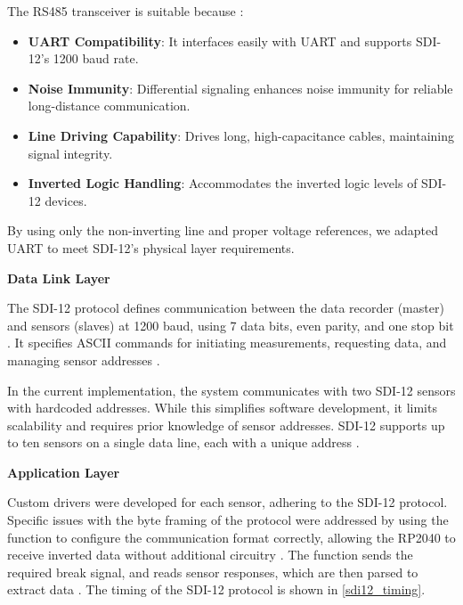 The RS485 transceiver is suitable because \cite{AnalogDevicesMAX1487}:

\begin{itemize} 
    \item \textbf{UART Compatibility}: It interfaces easily with UART and supports SDI-12's 1200 baud rate. 
    \item \textbf{Noise Immunity}: Differential signaling enhances noise immunity for reliable long-distance communication. 
    \item \textbf{Line Driving Capability}: Drives long, high-capacitance cables, maintaining signal integrity. 
    \item \textbf{Inverted Logic Handling}: Accommodates the inverted logic levels of SDI-12 devices. 
\end{itemize}

By using only the non-inverting line and proper voltage references, we adapted UART to meet SDI-12's physical layer requirements.

\textbf{Data Link Layer}

The SDI-12 protocol defines communication between the data recorder (master) and sensors (slaves) at 1200 baud, using 7 data bits, even parity, and one stop bit \cite{sdi12_datasheet}. It specifies ASCII commands for initiating measurements, requesting data, and managing sensor addresses \cite{sdi12_datasheet}.

In the current implementation, the system communicates with two SDI-12 sensors with hardcoded addresses. While this simplifies software development, it limits scalability and requires prior knowledge of sensor addresses. SDI-12 supports up to ten sensors on a single data line, each with a unique address \cite{sdi12_datasheet}.

\textbf{Application Layer}

Custom drivers were developed for each sensor, adhering to the SDI-12 protocol. Specific issues with the byte framing of the protocol were addressed by using the 
 function to configure the communication format correctly, allowing the RP2040 
to receive inverted data without additional circuitry \cite{RaspberryPiPicoSDK}. 
The  function sends the required break signal, and  reads sensor responses, which are then parsed to extract data \cite{RaspberryPiPicoSDK}. The timing of the SDI-12 protocol is shown 
in \cref{sdi12_timing}.

